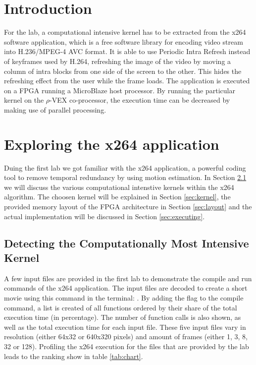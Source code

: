 \section{Introduction}
For the lab, a computational intensive kernel has to be extracted from the x264 software application, which is a free software library for encoding video stream into H.236/MPEG-4 AVC format. It is able to use Periodic Intra Refresh instead of keyframes used by H.264, refreshing the image of the video by moving a column of intra blocks from one side of the screen to the other. This hides the refreshing effect from the user while the frame loads. The  application is executed on a FPGA running a MicroBlaze host processor. By running the particular kernel on the $\rho$-VEX co-processor, the execution time can be decreased by making use of parallel processing. 

\section{Exploring the x264 application}
Duing the first lab we got familiar with the x264 application, a powerful coding tool to remove temporal redundancy by using motion estimation. In Section \ref{sec:intensive} we will discuss the various computational intenstive kernels within the x264 algorithm. The choosen kernel will be explained in Section \ref{sec:kernel}, the provided memory layout of the FPGA architecture in Section \ref{sec:layout} and the actual implementation will be discussed in Section \ref{sec:executing}.

\subsection{Detecting the Computationally Most Intensive Kernel}
\label{sec:intensive}
A few input files are provided in the first lab to demonstrate the compile and run commands of the x264 application. The  input files are decoded to create a short  movie using this command in the terminal: . By adding the  flag to the compile command, a list is created of all functions ordered by their share of the total execution time (in percentage). The number of function calls is also shown, as well as the total execution time for each input file. These five input  files vary in resolution (either 64x32 or 640x320 pixels) and amount of frames (either 1, 3, 8, 32 or 128). Profiling the x264 execution for the  files that are provided by the lab leads to the ranking show in table \ref{tab:chart}.

